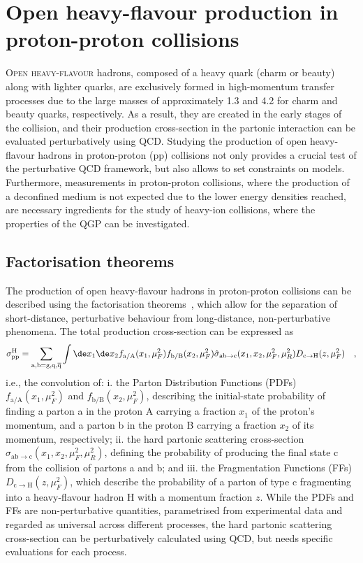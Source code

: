 \chapter{Open heavy-flavour production in proton-proton collisions}

\lettrine[lines=6,findent=0.pt]{O}{pen heavy-flavour} hadrons, composed of a heavy quark (charm or beauty) along with lighter quarks, are exclusively formed in high-momentum transfer processes due to the large masses of approximately 1.3 \gevcc and 4.2 \gevcc for charm and beauty quarks, respectively. As a result, they are created in the early stages of the collision, and their production cross-section in the partonic interaction can be evaluated perturbatively using QCD. Studying the production of open heavy-flavour hadrons in proton-proton (pp) collisions not only provides a crucial test of the perturbative QCD framework, but also allows to set constraints on models. Furthermore, measurements in proton-proton collisions, where the production of a deconfined medium is not expected due to the lower energy densities reached, are necessary ingredients for the study of heavy-ion collisions, where the properties of the QGP can be investigated. 

\section{Factorisation theorems}
The production of open heavy-flavour hadrons in proton-proton collisions can be described using the factorisation theorems~\cite{Collins:1989gx}, which allow for the separation of short-distance, perturbative behaviour from long-distance, non-perturbative phenomena. The total production cross-section can be expressed as
\begin{equation*}
    \sigma_{\text{pp}}^\mathrm{H} = \sum_\mathrm{a,b = g, q, \overline{q}} \int \de x_1 \de x_2 f_\mathrm{a/A}(x_1,\mu_F^2) f_\mathrm{b/B}(x_2,\mu_F^2) \hat{\sigma}_\mathrm{ab \rightarrow c} (x_1,x_2,\mu_F^2,\mu_R^2) D_\mathrm{c\rightarrow H}(z,\mu_F^2) \quad ,
\end{equation*}
i.e., the convolution of: i. the Parton Distribution Functions (PDFs) $f_\mathrm{a/A}(x_1,\mu_F^2)$ and $f_\mathrm{b/B}(x_2,\mu_F^2)$, describing the initial-state probability of finding a parton a in the proton A carrying a fraction $x_1$ of the proton's momentum, and a parton b in the proton B carrying a fraction $x_2$ of its momentum, respectively; ii. the hard partonic scattering cross-section $\hat{\sigma}_\mathrm{ab \rightarrow c} (x_1,x_2,\mu_F^2,\mu_R^2)$, defining the probability of producing the final state c from the collision of partons a and b; and iii. the Fragmentation Functions (FFs) $D_\mathrm{c\rightarrow H}(z,\mu_F^2)$, which describe the probability of a parton of type c fragmenting into a heavy-flavour hadron H with a momentum fraction $z$. While the PDFs and FFs are non-perturbative quantities, parametrised from experimental data and regarded as universal across different processes, the hard partonic scattering cross-section can be perturbatively calculated using QCD, but needs specific evaluations for each process. 

